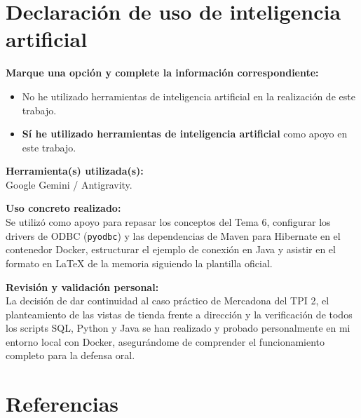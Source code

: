 \documentclass[a4paper,12pt]{article}
\begin{document}
\section{Declaración de uso de inteligencia artificial}

\textbf{Marque una opción y complete la información correspondiente:}

\begin{itemize}[label=$\square$,leftmargin=1.0cm]
  \item No he utilizado herramientas de inteligencia artificial en la realización de este trabajo.
  \item[\rlap{$\square$}{\raisebox{2pt}{\large\hspace{1pt}\textbf{X}}}] \textbf{Sí he utilizado herramientas de inteligencia artificial} como apoyo en este trabajo.
\end{itemize}

\textbf{Herramienta(s) utilizada(s):} \\
Google Gemini / Antigravity.

\textbf{Uso concreto realizado:} \\
Se utilizó como apoyo para repasar los conceptos del Tema 6, configurar los drivers de ODBC (\texttt{pyodbc}) y las dependencias de Maven para Hibernate en el contenedor Docker, estructurar el ejemplo de conexión en Java y asistir en el formato en LaTeX de la memoria siguiendo la plantilla oficial.

\textbf{Revisión y validación personal:} \\
La decisión de dar continuidad al caso práctico de Mercadona del TPI 2, el planteamiento de las vistas de tienda frente a dirección y la verificación de todos los scripts SQL, Python y Java se han realizado y probado personalmente en mi entorno local con Docker, asegurándome de comprender el funcionamiento completo para la defensa oral.

\section{Referencias}
\end{document}
